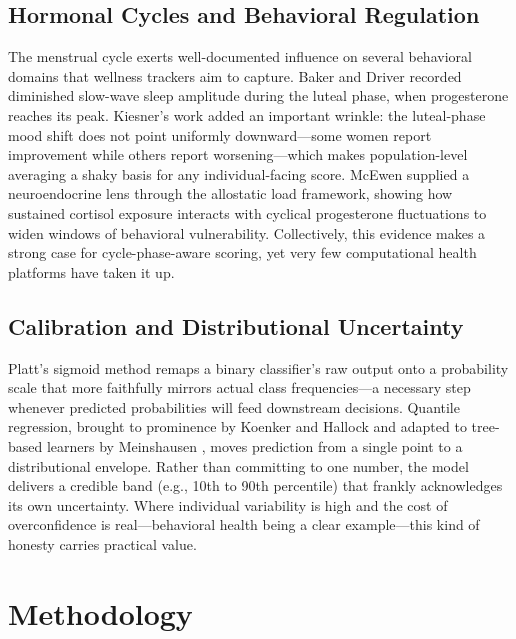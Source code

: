 \documentclass[conference]{IEEEtran}
\begin{document}
\subsection{Hormonal Cycles and Behavioral Regulation}
The menstrual cycle exerts well-documented influence on several behavioral domains that wellness trackers aim to capture. Baker and Driver \cite{baker2007sleep} recorded diminished slow-wave sleep amplitude during the luteal phase, when progesterone reaches its peak. Kiesner's work \cite{kiesner2012menstrual} added an important wrinkle: the luteal-phase mood shift does not point uniformly downward---some women report improvement while others report worsening---which makes population-level averaging a shaky basis for any individual-facing score. McEwen \cite{mcewen2008central} supplied a neuroendocrine lens through the allostatic load framework, showing how sustained cortisol exposure interacts with cyclical progesterone fluctuations to widen windows of behavioral vulnerability. Collectively, this evidence makes a strong case for cycle-phase-aware scoring, yet very few computational health platforms have taken it up.

\subsection{Calibration and Distributional Uncertainty}
Platt's sigmoid method \cite{platt1999calibration} remaps a binary classifier's raw output onto a probability scale that more faithfully mirrors actual class frequencies---a necessary step whenever predicted probabilities will feed downstream decisions. Quantile regression, brought to prominence by Koenker and Hallock \cite{koenker2001quantile} and adapted to tree-based learners by Meinshausen \cite{meinshausen2006quantile}, moves prediction from a single point to a distributional envelope. Rather than committing to one number, the model delivers a credible band (e.g., 10th to 90th percentile) that frankly acknowledges its own uncertainty. Where individual variability is high and the cost of overconfidence is real---behavioral health being a clear example---this kind of honesty carries practical value.

\section{Methodology}
\end{document}
